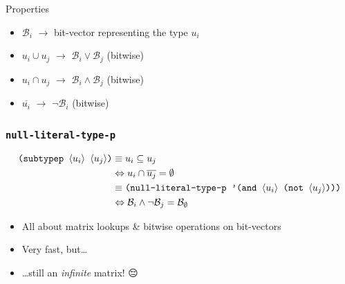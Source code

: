 \documentclass[aspectratio=169]{beamer}
\renewcommand\code[1]{\texttt{#1}}
\newcommand\rarr{\ensuremath{\rightarrow}}
\newcommand\plholder[1]{\ensuremath{\langle {#1} \rangle}}
\newcommand\emoji[2][\tiny]{{#1#2}}
\begin{document}
\begin{frame}
  \begin{popup}{.75}
    \vspace*{-9em}
    \begin{macosbox}{Properties}
      \begin{itemize}
      \item $\mathcal B_i$ \rarr{} bit-vector representing the type $u_i$
      \item $u_i \cup u_j$ \rarr{} $\mathcal B_i \vee \mathcal B_j$ (bitwise)
      \item $u_i \cap u_j$ \rarr{} $\mathcal B_i \wedge \mathcal B_j$ (bitwise)
      \item $\overline{u_i}$ \rarr{} $\neg\mathcal B_i$ (bitwise)
      \end{itemize}
    \end{macosbox}
  \end{popup}
\end{frame}

\begin{frame}[standout]
  \frametitle{\code{null-literal-type-p}}
  \begin{align*}
    \code{(subtypep \plholder{u_i} \plholder{u_j})} &\equiv u_i \subseteq u_j \\
                                                    &\Leftrightarrow u_i \cap \overline{u_j} = \emptyset\\
                                                    &\equiv \code{(null-literal-type-p '(and \plholder{u_i} (not \plholder{u_j})))} \\
                                                    &\Leftrightarrow \mathcal B_i \wedge \neg \mathcal B_j = \mathcal B_\emptyset
  \end{align*}

  \pause
  \begin{itemize}
  \item All about matrix lookups \& bitwise operations on bit-vectors
  \item Very fast, but\dots
    \pause
  \item \dots still an \emph{infinite} matrix! \emoji{😔}
  \end{itemize}
\end{frame}
\end{document}
